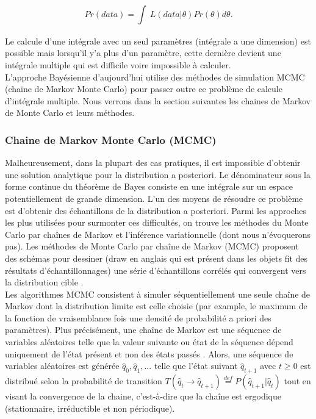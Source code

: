 \begin{equation}
	Pr(data) = \int_{}^{}  \,L(data|\theta)Pr(\theta)d\theta .
	\label{probability_of_data}
\end{equation}

Le calcule d’une intégrale avec un seul paramètres (intégrale a une dimension) est possible mais lorsqu’il y’a plus d’un paramètre, cette dernière devient une intégrale multiple qui est difficile voire impossible à calculer. \\
L’approche Bayésienne d’aujourd’hui utilise des méthodes de simulation MCMC (chaine de Markov Monte Carlo) pour passer outre ce problème de calcule d’intégrale multiple. Nous verrons dans la section suivantes les chaines de Markov de Monte Carlo et leurs méthodes.

\subsubsection{Chaine de Markov Monte Carlo (MCMC)}
Malheureusement, dans la plupart des cas pratiques, il est impossible d’obtenir une solution analytique pour la distribution a posteriori. Le dénominateur sous la forme continue du théorème de Bayes consiste en une intégrale sur un espace potentiellement de grande dimension. L’un des moyens de résoudre ce problème est d’obtenir des échantillons de la distribution a posteriori. Parmi les approches les plus utilisées pour surmonter ces difficultés, on trouve les méthodes du Monte Carlo par chaînes de Markov et l’inférence variationnelle (dont nous n’évoquerons pas). Les méthodes de Monte Carlo par chaîne de Markov (MCMC) proposent des schémas pour dessiner (draw en anglais qui est présent dans les objets fit des résultats d’échantillonnages) une série d'échantillons corrélés qui convergent vers la distribution cible \cite{neal1993probabilistic}. \\

Les algorithmes MCMC consistent à simuler séquentiellement une seule chaîne de Markov dont la distribution limite est celle choisie (par example, le maximum de la fonction de vraisemblance fois une densité de probabilité a priori des paramètres). Plus précisément, une chaîne de Markov est une séquence de variables aléatoires telle que la valeur suivante ou état de la séquence dépend uniquement de l’état présent et non des états passés \cite{neal1993probabilistic}. Alors, une séquence de variables aléatoires est générée \(\displaystyle \widehat{q}_{0}, \widehat{q}_{1}, ... \)  telle que l’état suivant \(\displaystyle \widehat{q}_{t+1} \) avec \(\displaystyle t \geq 0  \) est distribué selon la probabilité de transition \(\displaystyle T(\widehat{q}_{t} \rightarrow \widehat{q}_{t+1}) \overset{def}{=} P(\widehat{q}_{t+1}|\widehat{q}_{t}) \) \cite{gbedo2017techniques} tout en visant la convergence de la chaine, c’est-à-dire que la chaîne est ergodique (stationnaire, irréductible et non périodique). \\

